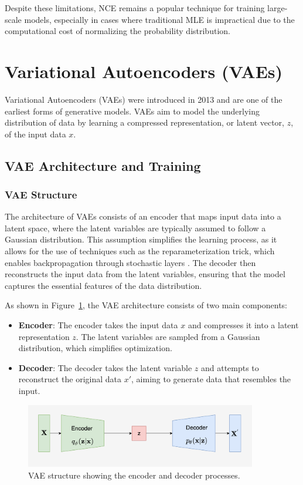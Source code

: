 Despite these limitations, NCE remains a popular technique for training large-scale models, especially in cases where traditional MLE is impractical due to the computational cost of normalizing the probability distribution.

\section{Variational Autoencoders (VAEs)}

Variational Autoencoders (VAEs) were introduced in 2013 and are one of the earliest forms of generative models. VAEs aim to model the underlying distribution of data by learning a compressed representation, or latent vector, \(z\), of the input data \(x\).

\subsection{VAE Architecture and Training}

\subsubsection{VAE Structure}
The architecture of VAEs consists of an encoder that maps input data into a latent space, where the latent variables are typically assumed to follow a Gaussian distribution. This assumption simplifies the learning process, as it allows for the use of techniques such as the reparameterization trick, which enables backpropagation through stochastic layers \citep{10.1561/2200000056}. The decoder then reconstructs the input data from the latent variables, ensuring that the model captures the essential features of the data distribution.

As shown in Figure~\ref{fig:VAE_structure}, the VAE architecture consists of two main components:
\begin{itemize}
    \item \textbf{Encoder}: The encoder takes the input data \(x\) and compresses it into a latent representation \(z\). The latent variables are sampled from a Gaussian distribution, which simplifies optimization.
    \item \textbf{Decoder}: The decoder takes the latent variable \(z\) and attempts to reconstruct the original data \(x'\), aiming to generate data that resembles the input.
\end{itemize}

\begin{figure}[H]
    \centering
    \includegraphics[width=0.9\textwidth]{./Images/VAE_structure.jpg}
    \caption{VAE structure showing the encoder and decoder processes.}
    \label{fig:VAE_structure}
\end{figure}


